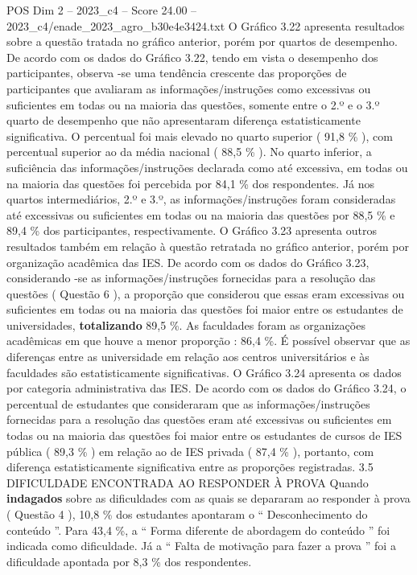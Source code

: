 \begin{textsample}{POS Dim 2 – 2023\_c4 – Score 24.00 – 2023\_c4/enade\_2023\_agro\_b30e4e3424.txt}
O Gráfico 3.22 apresenta resultados sobre a questão tratada no gráfico anterior, porém por quartos de desempenho.
De acordo com os dados do Gráfico 3.22, tendo em vista o desempenho dos participantes, observa -se uma tendência crescente das proporções de participantes que avaliaram as informações/instruções como excessivas ou suficientes em todas ou na maioria das questões, somente entre o 2.º e o 3.º quarto de desempenho que não apresentaram diferença estatisticamente significativa.
O percentual foi mais elevado no quarto superior ( 91,8 \% ), com percentual superior ao da média nacional ( 88,5 \% ).
No quarto inferior, a suficiência das informações/instruções declarada como até excessiva, em todas ou na maioria das questões foi percebida por 84,1 \% dos respondentes.
Já nos quartos intermediários, 2.º e 3.º, as informações/instruções foram consideradas até excessivas ou suficientes em todas ou na maioria das questões por 88,5 \% e 89,4 \% dos participantes, respectivamente.
O Gráfico 3.23 apresenta outros resultados também em relação à questão retratada no gráfico anterior, porém por organização acadêmica das IES.
De acordo com os dados do Gráfico 3.23, considerando -se as informações/instruções fornecidas para a resolução das questões ( Questão 6 ), a proporção que considerou que essas eram excessivas ou suficientes em todas ou na maioria das questões foi maior entre os estudantes de universidades, \textbf{totalizando} 89,5 \%.
As faculdades foram as organizações acadêmicas em que houve a menor proporção : 86,4 \%.
É possível observar que as diferenças entre as universidade em relação aos centros universitários e às faculdades são estatisticamente significativas.
O Gráfico 3.24 apresenta os dados por categoria administrativa das IES.
De acordo com os dados do Gráfico 3.24, o percentual de estudantes que consideraram que as informações/instruções fornecidas para a resolução das questões eram até excessivas ou suficientes em todas ou na maioria das questões foi maior entre os estudantes de cursos de IES pública ( 89,3 \% ) em relação ao de IES privada ( 87,4 \% ), portanto, com diferença estatisticamente significativa entre as proporções registradas. 3.5 DIFICULDADE ENCONTRADA AO RESPONDER À PROVA Quando \textbf{indagados} sobre as dificuldades com as quais se depararam ao responder à prova ( Questão 4 ), 10,8 \% dos estudantes apontaram o “ Desconhecimento do conteúdo ”.
Para 43,4 \%, a “ Forma diferente de abordagem do conteúdo ” foi indicada como dificuldade.
Já a “ Falta de motivação para fazer a prova ” foi a dificuldade apontada por 8,3 \% dos respondentes.

\end{textsample}
